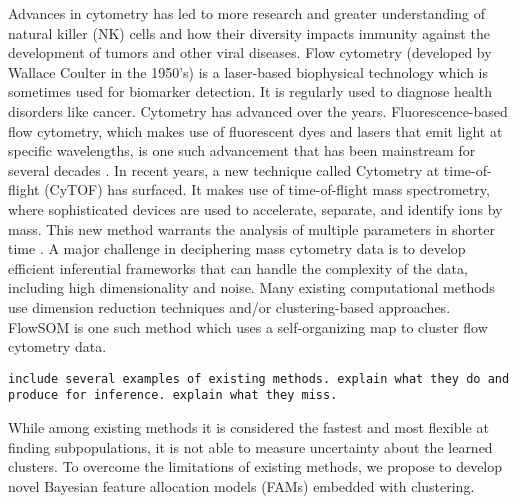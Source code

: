 \documentclass[12pt,]{article}
\def\Z{\bm{Z}}
\begin{document}
Advances in cytometry has led to more research and greater understanding  of
natural killer (NK) cells and how their diversity impacts immunity against the
development of tumors and other viral diseases. Flow cytometry (developed by
Wallace Coulter in the 1950's) is a laser-based biophysical technology which is
sometimes used for biomarker detection. It is regularly used to diagnose health
disorders like cancer. Cytometry has advanced over the years.
Fluorescence-based flow cytometry, which makes use of fluorescent dyes and
lasers that emit light at specific wavelengths, is one such advancement that
has been mainstream for several decades \citep{herzenberg2002history}.  In recent
years, a new technique called Cytometry at time-of-flight (CyTOF) has surfaced.
It makes use of time-of-flight mass spectrometry, where sophisticated devices
are used to accelerate, separate, and identify ions by mass. This new method
warrants the analysis of multiple parameters in shorter time \citep{cheung2011screening}. 
A major challenge in deciphering mass cytometry data is to develop efficient
inferential frameworks that can handle the complexity of the data, including
high dimensionality and noise. Many existing computational methods use
dimension reduction techniques and/or clustering-based approaches. 
FlowSOM \citep{van2015flowsom} is one such method which uses a self-organizing
map to cluster flow cytometry data.

{\tt include several examples of existing methods. explain what they do and
produce for inference. explain what they miss.}

While among existing methods it is considered the fastest and most flexible at
finding subpopulations, it is not able to measure uncertainty about the learned
clusters. To overcome the limitations of existing methods, we propose to
develop novel Bayesian feature allocation models (FAMs) embedded with
clustering. 
\end{document}

